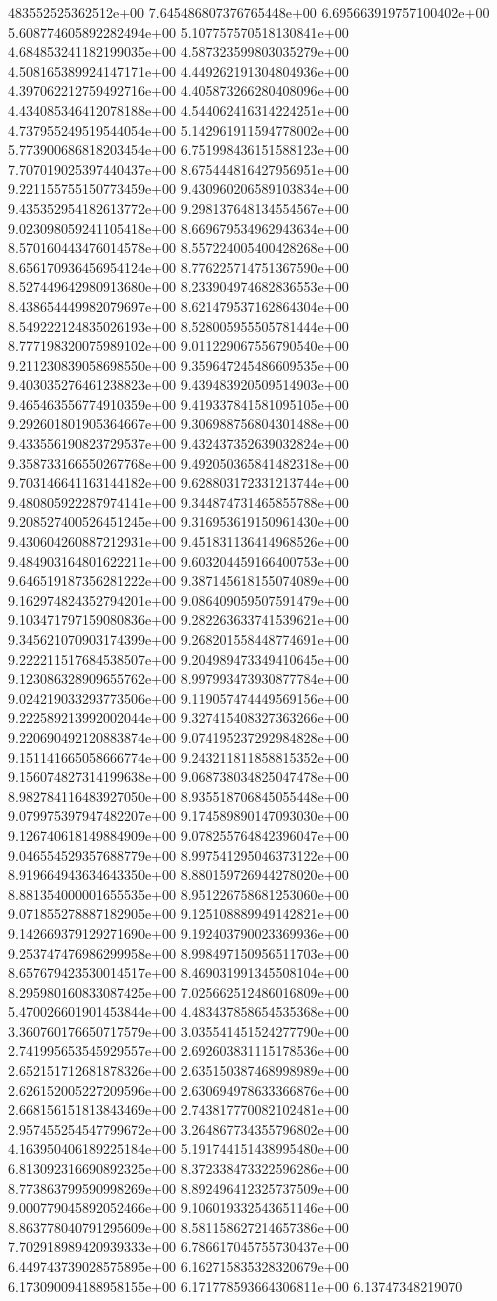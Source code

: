 483552525362512e+00	7.645486807376765448e+00	6.695663919757100402e+00	5.608774605892282494e+00	5.107757570518130841e+00	4.684853241182199035e+00	4.587323599803035279e+00	4.508165389924147171e+00	4.449262191304804936e+00	4.397062212759492716e+00	4.405873266280408096e+00	4.434085346412078188e+00	4.544062416314224251e+00	4.737955249519544054e+00	5.142961911594778002e+00	5.773900686818203454e+00	6.751998436151588123e+00	7.707019025397440437e+00	8.675444816427956951e+00	9.221155755150773459e+00	9.430960206589103834e+00	9.435352954182613772e+00	9.298137648134554567e+00	9.023098059241105418e+00	8.669679534962943634e+00	8.570160443476014578e+00	8.557224005400428268e+00	8.656170936456954124e+00	8.776225714751367590e+00	8.527449642980913680e+00	8.233904974682836553e+00	8.438654449982079697e+00	8.621479537162864304e+00	8.549222124835026193e+00	8.528005955505781444e+00	8.777198320075989102e+00	9.011229067556790540e+00	9.211230839058698550e+00	9.359647245486609535e+00	9.403035276461238823e+00	9.439483920509514903e+00	9.465463556774910359e+00	9.419337841581095105e+00	9.292601801905364667e+00	9.306988756804301488e+00	9.433556190823729537e+00	9.432437352639032824e+00	9.358733166550267768e+00	9.492050365841482318e+00	9.703146641163144182e+00	9.628803172331213744e+00	9.480805922287974141e+00	9.344874731465855788e+00	9.208527400526451245e+00	9.316953619150961430e+00	9.430604260887212931e+00	9.451831136414968526e+00	9.484903164801622211e+00	9.603204459166400753e+00	9.646519187356281222e+00	9.387145618155074089e+00	9.162974824352794201e+00	9.086409059507591479e+00	9.103471797159080836e+00	9.282263633741539621e+00	9.345621070903174399e+00	9.268201558448774691e+00	9.222211517684538507e+00	9.204989473349410645e+00	9.123086328909655762e+00	8.997993473930877784e+00	9.024219033293773506e+00	9.119057474449569156e+00	9.222589213992002044e+00	9.327415408327363266e+00	9.220690492120883874e+00	9.074195237292984828e+00	9.151141665058666774e+00	9.243211811858815352e+00	9.156074827314199638e+00	9.068738034825047478e+00	8.982784116483927050e+00	8.935518706845055448e+00	9.079975397947482207e+00	9.174589890147093030e+00	9.126740618149884909e+00	9.078255764842396047e+00	9.046554529357688779e+00	8.997541295046373122e+00	8.919664943634643350e+00	8.880159726944278020e+00	8.881354000001655535e+00	8.951226758681253060e+00	9.071855278887182905e+00	9.125108889949142821e+00	9.142669379129271690e+00	9.192403790023369936e+00	9.253747476986299958e+00	8.998497150956511703e+00	8.657679423530014517e+00	8.469031991345508104e+00	8.295980160833087425e+00	7.025662512486016809e+00	5.470026601901453844e+00	4.483437858654535368e+00	3.360760176650717579e+00	3.035541451524277790e+00	2.741995653545929557e+00	2.692603831115178536e+00	2.652151712681878326e+00	2.635150387468998989e+00	2.626152005227209596e+00	2.630694978633366876e+00	2.668156151813843469e+00	2.743817770082102481e+00	2.957455254547799672e+00	3.264867734355796802e+00	4.163950406189225184e+00	5.191744151438995480e+00	6.813092316690892325e+00	8.372338473322596286e+00	8.773863799590998269e+00	8.892496412325737509e+00	9.000779045892052466e+00	9.106019332543651146e+00	8.863778040791295609e+00	8.581158627214657386e+00	7.702918989420939333e+00	6.786617045755730437e+00	6.449743739028575895e+00	6.162715835328320679e+00	6.173090094188958155e+00	6.171778593664306811e+00	6.13747348219070